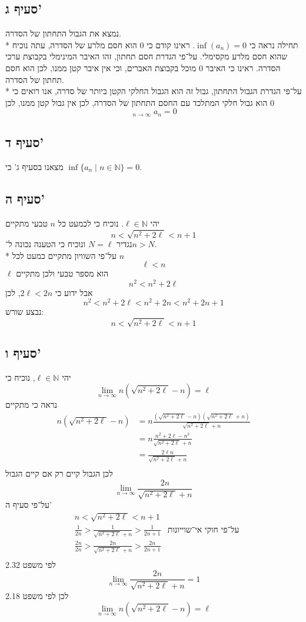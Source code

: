 \documentclass[a4paper]{article}
\DeclareMathOperator*\lowlim{\underline{lim}}
\def\NN{\mathbb{N}}
\begin{document}
\subsection{סעיף ג'}
נמצא את הגבול התחתון של הסדרה. \\*
תחילה נראה כי $\inf (a_n) = 0$.
ראינו קודם כי $0$ הוא חסם מלרע של הסדרה,
עתה נוכיח שהוא חסם מלרע מקסימלי.
על־פי הגדרת חסם תחתון, זהו האיבר המינימלי בקבוצת ערכי הסדרה.
ראינו כי האיבר $0$ מוכל בקבוצת האברים, וכי אין איבר קטן ממנו,
לכן הוא חסם תחתון של הסדרה. \\*
על־פי הגדרת הגבול התחתון, גבול זה הוא הגבול החלקי הקטן ביותר של סדרה,
אנו רואים כי $0$ הוא גבול חלקי המתלכד עם החסם התחתון של הסדרה,
לכן אין גבול קטן ממנו, לכן
\[
	\lowlim_{n \to \infty} a_n = 0
\]

\subsection{סעיף ד'}
מצאנו בסעיף ג' כי $\inf \{ a_n \mid n \in \NN \} = 0$.

\subsection{סעיף ה'}
יהי $\ell \in \NN$. נוכיח כי לכמעט כל $n$ טבעי מתקיים
\[
	n < \sqrt{n^2 + 2\ell} < n + 1
\]
נגדיר $N = \ell$ ונוכיח כי הטענה נכונה ל־$n > N$. \\*
על־פי השוויון מתקיים כמעט לכל $n$
\[
	\ell < n
\]
$\ell$ הוא מספר טבעי ולכן מתקיים
\[
	n^2 < n^2 + 2\ell
\]
אבל ידוע כי $2\ell < 2n$, לכן
\[
	n^2 < n^2 + 2\ell < n^2 + 2n < n^2 + 2n + 1
\]
נבצע שורש:
\[
	n < \sqrt{n^2 + 2\ell} < n + 1
\]

\subsection{סעיף ו'}
יהי $\ell \in \NN$, נוכיח כי
\[
	\lim_{n \to \infty} n(\sqrt{n^2 + 2\ell} - n) = \ell
\]
נראה כי מתקיים
\begin{align*}
	n(\sqrt{n^2 + 2\ell} - n)
	& = n \frac{(\sqrt{n^2 + 2\ell} - n)(\sqrt{n^2 + 2\ell} + n)}
	{\sqrt{n^2 + 2\ell} + n} \\
	& = n \frac{n^2 + 2\ell - n^2} {\sqrt{n^2 + 2\ell} + n} \\
	& = \frac{2\ell n} {\sqrt{n^2 + 2\ell} + n} \\
\end{align*}
לכן הגבול קיים רק אם קיים הגבול
\[
	\lim_{n \to \infty} \frac{2n} {\sqrt{n^2 + 2\ell} + n}
\]
על־פי סעיף ה'
\begin{align*}
	& n < \sqrt{n^2 + 2\ell} < n + 1 \\
	& \frac{1}{2n} > \frac{1}{\sqrt{n^2 + 2\ell} + n} > \frac{1}{2n + 1} &
	\text{על־פי חוקי אי־שוייונות} \\
	& \frac{2n}{2n} > \frac{2n}{\sqrt{n^2 + 2\ell} + n} > \frac{2n}{2n + 1} \\
\end{align*}
לפי משפט 2.32
\[
	\lim_{n \to \infty} \frac{2n} {\sqrt{n^2 + 2\ell} + n} = 1
\]
לכן לפי משפט 2.18
\[
	\lim_{n \to \infty} n(\sqrt{n^2 + 2\ell} - n) = \ell
\]
\end{document}
